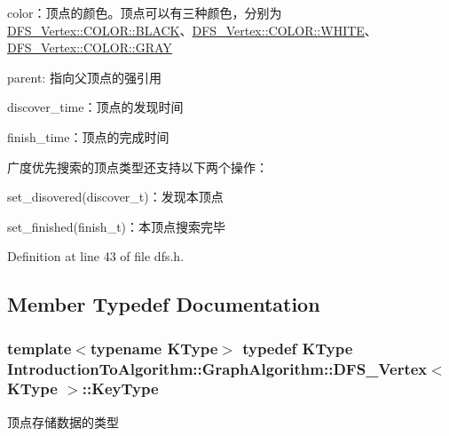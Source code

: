 \begin{DoxyItemize}
\item {\ttfamily color}：顶点的颜色。顶点可以有三种颜色，分别为{\ttfamily \hyperlink{struct_introduction_to_algorithm_1_1_graph_algorithm_1_1_d_f_s___vertex_a9455444fdfb1b29f24c1d27e74e7c124a08d0012388564e95c3b4a7407cf04965}{D\+F\+S\+\_\+\+Vertex\+::\+C\+O\+L\+O\+R\+::\+B\+L\+A\+C\+K}}、{\ttfamily \hyperlink{struct_introduction_to_algorithm_1_1_graph_algorithm_1_1_d_f_s___vertex_a9455444fdfb1b29f24c1d27e74e7c124ab5bf627e448384cf3a4c35121ca6008d}{D\+F\+S\+\_\+\+Vertex\+::\+C\+O\+L\+O\+R\+::\+W\+H\+I\+T\+E}}、{\ttfamily \hyperlink{struct_introduction_to_algorithm_1_1_graph_algorithm_1_1_d_f_s___vertex_a9455444fdfb1b29f24c1d27e74e7c124a48bf014c704c9eaae100a98006a37bf7}{D\+F\+S\+\_\+\+Vertex\+::\+C\+O\+L\+O\+R\+::\+G\+R\+A\+Y}}
\item {\ttfamily parent}\+: 指向父顶点的强引用
\item {\ttfamily discover\+\_\+time}：顶点的发现时间
\item {\ttfamily finish\+\_\+time}：顶点的完成时间
\end{DoxyItemize}

广度优先搜索的顶点类型还支持以下两个操作：


\begin{DoxyItemize}
\item {\ttfamily set\+\_\+disovered(discover\+\_\+t)}：发现本顶点
\item {\ttfamily set\+\_\+finished(finish\+\_\+t)}：本顶点搜索完毕 
\end{DoxyItemize}

Definition at line 43 of file dfs.\+h.



\subsection{Member Typedef Documentation}
\hypertarget{struct_introduction_to_algorithm_1_1_graph_algorithm_1_1_d_f_s___vertex_ab53cda3a7d135ed892b298c14d5579fe}{}
\subsubsection[{Key\+Type}]{\setlength{\rightskip}{0pt plus 5cm}template$<$typename K\+Type$>$ typedef K\+Type {\bf Introduction\+To\+Algorithm\+::\+Graph\+Algorithm\+::\+D\+F\+S\+\_\+\+Vertex}$<$ K\+Type $>$\+::{\bf Key\+Type}}\label{struct_introduction_to_algorithm_1_1_graph_algorithm_1_1_d_f_s___vertex_ab53cda3a7d135ed892b298c14d5579fe}
顶点存储数据的类型 

